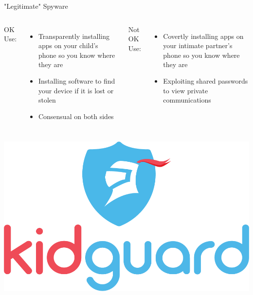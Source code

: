 \documentclass[nobackground,dvipsnames,table]{beamer}
\begin{document}
\begin{frame}{"Legitimate" Spyware}
    \begin{columns}
            OK Use:
            \begin{itemize}
                \item Transparently installing apps on your child’s phone so you know where they are
                \item Installing software to find your device if it is lost or stolen
                \item Consensual on both sides
            \end{itemize}
            Not OK Use:
            \begin{itemize}
                \item Covertly installing apps on your intimate partner’s phone so you know where they are
                \item Exploiting shared passwords to view private communications
            \end{itemize}
    \end{columns}
    \vspace{0.1\textheight}
    \begin{columns}
            \includegraphics[width=\textwidth]{kidguard}

\end{columns}
\end{frame}
\end{document}
